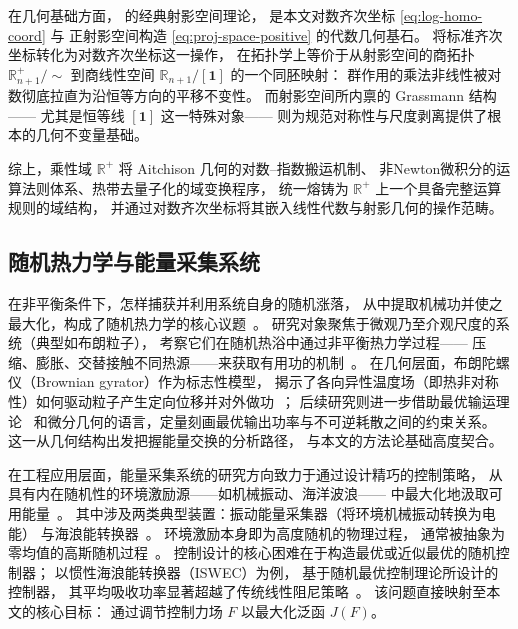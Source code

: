 ﻿\documentclass[10pt,a4paper]{article}
\numberwithin{equation}{section}
\begin{document}
在几何基础方面，\textcite{Hartshorne1977} 的经典射影空间理论，
是本文对数齐次坐标 \eqref{eq:log-homo-coord} 与
正射影空间构造 \eqref{eq:proj-space-positive} 的代数几何基石。
将标准齐次坐标转化为对数齐次坐标这一操作，
在拓扑学上等价于从射影空间的商拓扑 $\mathbb R^+_{n+1}/\sim$
到商线性空间 $\mathbb R_{n+1}/[\mathbf 1]$ 的一个同胚映射：
群作用的乘法非线性被对数彻底拉直为沿恒等方向的平移不变性。
而射影空间所内禀的 Grassmann 结构——
尤其是恒等线 $[\mathbf 1]$ 这一特殊对象——
则为规范对称性与尺度剥离提供了根本的几何不变量基础。

综上，乘性域 $\boxed{\mathbb R^+}$ 将 Aitchison 几何的对数--指数搬运机制、
非Newton微积分的运算法则体系、热带去量子化的域变换程序，
统一熔铸为 $\mathbb R^+$ 上一个具备完整运算规则的域结构，
并通过对数齐次坐标将其嵌入线性代数与射影几何的操作范畴。

\subsection{随机热力学与能量采集系统}

在非平衡条件下，怎样捕获并利用系统自身的随机涨落，
从中提取机械功并使之最大化，构成了随机热力学的核心议题~\cite{Seifert2012Stochastic, Esposito2010Entropy}。
研究对象聚焦于微观乃至介观尺度的系统（典型如布朗粒子），
考察它们在随机热浴中通过非平衡热力学过程——
压缩、膨胀、交替接触不同热源——来获取有用功的机制~\cite{Kramers1940Brownian, Jarzynski1997Nonequilibrium}。
在几何层面，布朗陀螺仪（Brownian gyrator）作为标志性模型，
揭示了各向异性温度场（即热非对称性）如何驱动粒子产生定向位移并对外做功~\cite{Filippetti2021Brownian, Sasa2014Stochastic}；
后续研究则进一步借助最优输运理论~\cite{Villani2009Optimal}
和微分几何的语言，定量刻画最优输出功率与不可逆耗散之间的约束关系。
这一从几何结构出发把握能量交换的分析路径，
与本文的方法论基础高度契合。

在工程应用层面，能量采集系统的研究方向致力于通过设计精巧的控制策略，
从具有内在随机性的环境激励源——如机械振动、海洋波浪——
中最大化地汲取可用能量~\cite{Zuo2013Energy, Ding2019Energy}。
其中涉及两类典型装置：振动能量采集器（将环境机械振动转换为电能）
与海浪能转换器~\cite{Falnes2002Ocean, Li2019Review}。
环境激励本身即为高度随机的物理过程，
通常被抽象为零均值的高斯随机过程~\cite{Rice1944Mathematical}。
控制设计的核心困难在于构造最优或近似最优的随机控制器；
以惯性海浪能转换器（ISWEC）为例，
基于随机最优控制理论所设计的控制器，
其平均吸收功率显著超越了传统线性阻尼策略~\cite{Giorgi2020Nonlinear, Paduano2021Control}。
该问题直接映射至本文的核心目标：
通过调节控制力场 $F$ 以最大化泛函 $J(F)$。
\end{document}
